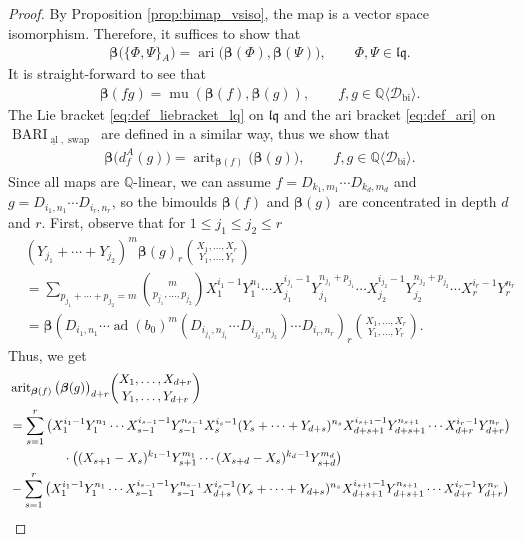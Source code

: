 \documentclass[12pt,reqno]{amsart}
\numberwithin{equation}{section}
\theoremstyle{definition}
\newcommand{\QQ}{\mathbb{Q}}
\newcommand{\BARI}{\operatorname{BARI}_{\underline{\operatorname{al}},\operatorname{swap}}}
\newcommand{\bimap}{\boldsymbol{\beta}}
\newcommand{\ad}{\operatorname{ad}}
\newcommand{\Dbi}{\mathcal{D}_{\operatorname{bi}}}
\newcommand{\QDbi}{\QQ\langle \Dbi\rangle}
\newcommand{\lqq}{\mathfrak{lq}}
\newcommand{\ari}[2]{\{#1,#2\}\!_A}
\newcommand{\der}[1]{d_{#1}^A}
\begin{document}
\begin{proof} By Proposition \ref{prop:bimap_vsiso}, the map is a vector space isomorphism. Therefore, it suffices to show that
\begin{align*}
\bimap\big(\ari{\Phi}{\Psi}\big)=\operatorname{ari}\big(\bimap(\Phi),\bimap(\Psi)\big),\qquad \Phi,\Psi\in\lqq.
\end{align*}
It is straight-forward to see that
\begin{align*}
\bimap(fg)=\operatorname{mu}(\bimap(f),\bimap(g)), \qquad f,g\in \QDbi.
\end{align*}
The Lie bracket \eqref{eq:def_liebracket_lq} on $\lqq$ and the ari bracket \eqref{eq:def_ari} on $\BARI$ are defined in a similar way, thus we show that
\begin{align*}
\bimap\big(\der{f}(g)\big)=\operatorname{arit}_{\bimap(f)}\big(\bimap(g)\big),\qquad f,g\in\QDbi.
\end{align*}
Since all maps are $\QQ$-linear, we can assume $f=D_{k_1,m_1}\cdots D_{k_d,m_d}$ and $g=D_{i_1,n_1}\cdots D_{i_r,n_r}$, so the bimoulds $\bimap(f)$ and $\bimap(g)$ are concentrated in depth $d$ and $r$. First, observe that for $1\leq j_1\leq j_2\leq r$
\begin{align} \label{eq:ad(b0)_and_Y}
&(Y_{j_1}+\cdots+Y_{j_2})^m\bimap(g)_r\binom{X_1,\ldots,X_r}{Y_1,\ldots,Y_r} \nonumber \\
&=\sum_{p_{j_1}+\cdots+p_{j_2}=m} \binom{m}{p_{j_1},\ldots,p_{j_2}} X_1^{i_1-1}Y_1^{n_1}\cdots X_{j_1}^{i_{j_1}-1}Y_{j_1}^{n_{j_1}+p_{j_1}}\cdots X_{j_2}^{i_{j_2}-1}Y_{j_2}^{n_{j_2}+p_{j_2}}\cdots X_r^{i_r-1}Y_r^{n_r} \nonumber \\
&=\bimap(D_{i_1,n_1}\cdots \ad(b_0)^m(D_{i_{j_1},n_{j_1}}\cdots D_{i_{j_2},n_{j_2}})\cdots D_{i_r,n_r})_r\binom{X_1,\ldots,X_r}{Y_1,\ldots,Y_r}.
\end{align}
Thus, we get
\begin{align*}
&\operatorname{arit}_{\bimap(f)}\big(\bimap(g)\big)_{d+r}\binom{X_1,\ldots,X_{d+r}}{Y_1,\ldots,Y_{d+r}}\\ 
&=\sum_{s=1}^r \big(X_1^{i_1-1}Y_1^{n_1}\cdots X_{s-1}^{i_{s-1}-1}Y_{s-1}^{n_{s-1}}X_s^{i_s-1}(Y_s+\cdots+Y_{d+s})^{n_s}X_{d+s+1}^{i_{s+1}-1}Y_{d+s+1}^{n_{s+1}}\cdots X_{d+r}^{i_r-1}Y_{d+r}^{n_r}\big)\\
&\hspace{1.5cm}\cdot\big((X_{s+1}-X_s)^{k_1-1}Y_{s+1}^{m_1}\cdots (X_{s+d}-X_s)^{k_d-1}Y_{s+d}^{m_d}\big) \\
&- \sum_{s=1}^r \big(X_1^{i_1-1}Y_1^{n_1}\cdots X_{s-1}^{i_{s-1}-1}Y_{s-1}^{n_{s-1}}X_{d+s}^{i_s-1}(Y_s+\cdots+Y_{d+s})^{n_s}X_{d+s+1}^{i_{s+1}-1}Y_{d+s+1}^{n_{s+1}}\cdots X_{d+r}^{i_r-1}Y_{d+r}^{n_r}\big)\\

\end{align*}
\end{proof}
\end{document}
